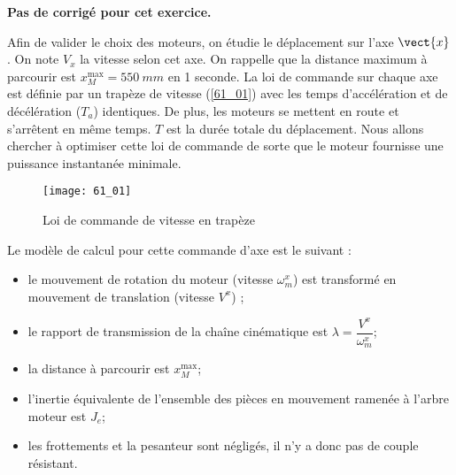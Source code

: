 \normaltrue
\correctionfalse


\setcounter{numques}{0}
\ifcorrection
\else
\textbf{Pas de corrigé pour cet exercice.}
\fi

Afin de valider le choix des moteurs, on étudie le déplacement sur l’axe $\vect{x}$.%
On note $V_x$ la vitesse selon cet axe.
On rappelle que la distance maximum à parcourir est $x_M^{\text{max}} = \SI{550}{mm}$ en 1 seconde.
La loi de commande sur chaque axe est définie par un trapèze de vitesse (\autoref{61_01})
avec les temps d’accélération et de décélération ($T_a$) identiques. De plus, les moteurs se mettent en route et s’arrêtent en
même temps. $T$ est la durée totale du déplacement. Nous allons chercher à optimiser cette loi de commande de sorte
que le moteur fournisse une puissance instantanée minimale.



\begin{figure}[H]
\centering
\texttt{[image: 61\_01]}
\caption{\label{61_01} Loi de commande de vitesse en trapèze}
\end{figure}

Le modèle de calcul pour cette commande d’axe est le suivant :
\begin{itemize}
\item le mouvement de rotation du moteur (vitesse $\omega_m^x$) est transformé en mouvement de translation (vitesse $V^x$) ;
\item le rapport de transmission de la chaîne cinématique est $\lambda = \dfrac{V^x}{\omega_m^x}$;
\item la distance à parcourir est $x_M^{\text{max}}$;
\item l’inertie équivalente de l’ensemble des pièces en mouvement ramenée à l’arbre moteur est $J_e$;
\item les frottements et la pesanteur sont négligés, il n’y a donc pas de couple résistant.
\end{itemize}




